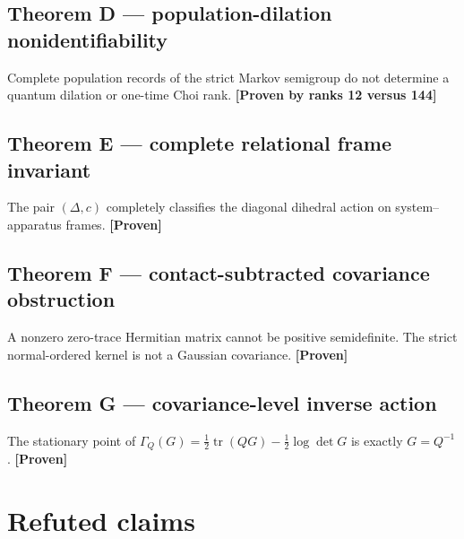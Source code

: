 \documentclass[11pt,a4paper,openany]{report}
\newcommand{\statusProven}{\textcolor{fingreen}{[Proven]}}
\begin{document}
\subsection{Theorem D — population-dilation nonidentifiability}

Complete population records of the strict Markov semigroup do not determine a quantum dilation or one-time Choi rank. \textbf{[Proven by ranks 12 versus 144]}

\subsection{Theorem E — complete relational frame invariant}

The pair \((\Delta,c)\) completely classifies the diagonal dihedral action on system–apparatus frames. \textbf{\statusProven{}}

\subsection{Theorem F — contact-subtracted covariance obstruction}

A nonzero zero-trace Hermitian matrix cannot be positive semidefinite. The strict normal-ordered kernel is not a Gaussian covariance. \textbf{\statusProven{}}

\subsection{Theorem G — covariance-level inverse action}

The stationary point of \(\Gamma_Q(G)=\tfrac12\operatorname{tr}(QG)-\tfrac12\log\det G\) is exactly \(G=Q^{-1}\). \textbf{\statusProven{}}

\section{Refuted claims}
\end{document}
